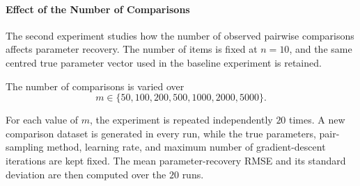 \documentclass[11pt,a4paper]{article}
\begin{document}
\paragraph{Effect of the Number of Comparisons}

The second experiment studies how the number of observed pairwise
comparisons affects parameter recovery. The number of items is fixed at
\(n=10\), and the same centred true parameter vector used in the
baseline experiment is retained.

The number of comparisons is varied over
\begin{equation}
    m
    \in
    \{50,100,200,500,1000,2000,5000\}.
\end{equation}

For each value of \(m\), the experiment is repeated independently
\(20\) times. A new comparison dataset is generated in every run, while
the true parameters, pair-sampling method, learning rate, and maximum
number of gradient-descent iterations are kept fixed. The mean
parameter-recovery RMSE and its standard deviation are then computed
over the \(20\) runs.
\end{document}
